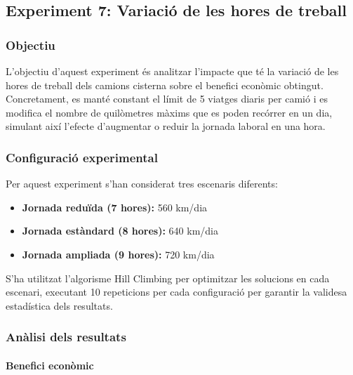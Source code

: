 \subsection{Experiment 7: Variació de les hores de treball}

\vspace{0.5cm}


\subsubsection{Objectiu}

L'objectiu d'aquest experiment és analitzar l'impacte que té la variació de les hores de treball dels camions cisterna sobre el benefici econòmic obtingut. Concretament, es manté constant el límit de 5 viatges diaris per camió i es modifica el nombre de quilòmetres màxims que es poden recórrer en un dia, simulant així l'efecte d'augmentar o reduir la jornada laboral en una hora.

\vspace{0.5cm}


\subsubsection{Configuració experimental}

Per aquest experiment s'han considerat tres escenaris diferents:

\begin{itemize}
    \item \textbf{Jornada reduïda (7 hores):} 560 km/dia
    \item \textbf{Jornada estàndard (8 hores):} 640 km/dia
    \item \textbf{Jornada ampliada (9 hores):} 720 km/dia
\end{itemize}

S'ha utilitzat l'algorisme Hill Climbing per optimitzar les solucions en cada escenari, executant 10 repeticions per cada configuració per garantir la validesa estadística dels resultats.

\vspace{0.5cm}


\subsubsection{Anàlisi dels resultats}

\paragraph{Benefici econòmic}

